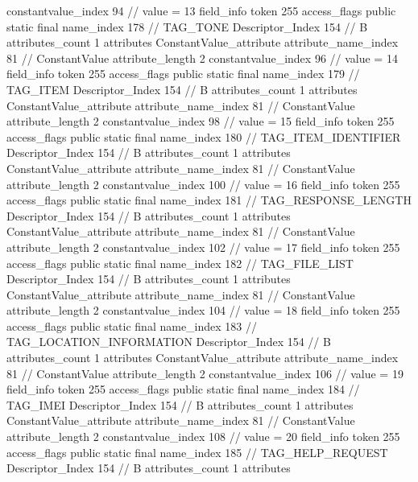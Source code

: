 {{{{{{{					constantvalue_index	94		// value = 13
				}
				}
			}
			field_info {
				token	255
				access_flags	public static final
				name_index	178		// TAG_TONE
				Descriptor_Index	154		// B
				attributes_count	1
				attributes {
				ConstantValue_attribute {
					attribute_name_index	81		// ConstantValue
					attribute_length	2
					constantvalue_index	96		// value = 14
				}
				}
			}
			field_info {
				token	255
				access_flags	public static final
				name_index	179		// TAG_ITEM
				Descriptor_Index	154		// B
				attributes_count	1
				attributes {
				ConstantValue_attribute {
					attribute_name_index	81		// ConstantValue
					attribute_length	2
					constantvalue_index	98		// value = 15
				}
				}
			}
			field_info {
				token	255
				access_flags	public static final
				name_index	180		// TAG_ITEM_IDENTIFIER
				Descriptor_Index	154		// B
				attributes_count	1
				attributes {
				ConstantValue_attribute {
					attribute_name_index	81		// ConstantValue
					attribute_length	2
					constantvalue_index	100		// value = 16
				}
				}
			}
			field_info {
				token	255
				access_flags	public static final
				name_index	181		// TAG_RESPONSE_LENGTH
				Descriptor_Index	154		// B
				attributes_count	1
				attributes {
				ConstantValue_attribute {
					attribute_name_index	81		// ConstantValue
					attribute_length	2
					constantvalue_index	102		// value = 17
				}
				}
			}
			field_info {
				token	255
				access_flags	public static final
				name_index	182		// TAG_FILE_LIST
				Descriptor_Index	154		// B
				attributes_count	1
				attributes {
				ConstantValue_attribute {
					attribute_name_index	81		// ConstantValue
					attribute_length	2
					constantvalue_index	104		// value = 18
				}
				}
			}
			field_info {
				token	255
				access_flags	public static final
				name_index	183		// TAG_LOCATION_INFORMATION
				Descriptor_Index	154		// B
				attributes_count	1
				attributes {
				ConstantValue_attribute {
					attribute_name_index	81		// ConstantValue
					attribute_length	2
					constantvalue_index	106		// value = 19
				}
				}
			}
			field_info {
				token	255
				access_flags	public static final
				name_index	184		// TAG_IMEI
				Descriptor_Index	154		// B
				attributes_count	1
				attributes {
				ConstantValue_attribute {
					attribute_name_index	81		// ConstantValue
					attribute_length	2
					constantvalue_index	108		// value = 20
				}
				}
			}
			field_info {
				token	255
				access_flags	public static final
				name_index	185		// TAG_HELP_REQUEST
				Descriptor_Index	154		// B
				attributes_count	1
				attributes {
}}}}}}
